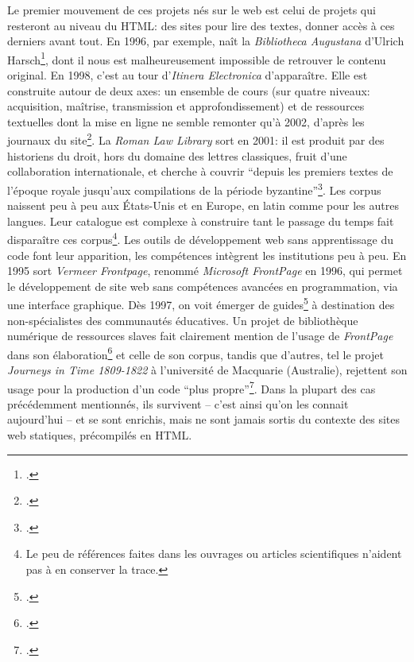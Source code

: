 Le premier mouvement de ces projets nés sur le web est celui de projets qui resteront au niveau du HTML: des sites pour lire des textes, donner accès à ces derniers avant tout. En 1996, par exemple, naît la \textit{Bibliotheca Augustana} d'Ulrich Harsch\footcite{harsch_bibliotheca_nodate}, dont il nous est malheureusement impossible de retrouver le contenu original. En 1998, c'est au tour d'\textit{Itinera Electronica} d'apparaître. Elle est construite autour de deux axes: un ensemble de cours (sur quatre niveaux: acquisition, maîtrise, transmission et approfondissement) et de ressources textuelles dont la mise en ligne ne semble remonter qu'à 2002, d'après les journaux du site\footcite{meurant_itinera_nodate}. La \textit{Roman Law Library} sort en 2001: il est produit par des historiens du droit, hors du domaine des lettres classiques, fruit d'une collaboration internationale, et cherche à couvrir ``depuis les premiers textes de l'époque royale jusqu'aux compilations de la période byzantine''\footcite{lassard_roman_2001}. Les corpus naissent peu à peu aux États-Unis et en Europe, en latin comme pour les autres langues. Leur catalogue est complexe à construire tant le passage du temps fait disparaître ces corpus\footnote{Le peu de références faites dans les ouvrages ou articles scientifiques n'aident pas à en conserver la trace.}. Les outils de développement web sans apprentissage du code font leur apparition, les compétences intègrent les institutions peu à peu. En 1995 sort \textit{Vermeer Frontpage}, renommé \textit{Microsoft FrontPage} en 1996, qui permet le développement de site web sans compétences avancées en programmation, via une interface graphique. Dès 1997, on voit émerger de guides\footcite{la1997guide} à destination des non-spécialistes des communautés éducatives. Un projet de bibliothèque numérique de ressources slaves fait clairement mention de l'usage de \textit{FrontPage} dans son élaboration\footcite{deyrup1998character} et celle de son corpus, tandis que d'autres, tel le projet \textit{Journeys in Time 1809-1822} à l'université de Macquarie (Australie), rejettent son usage pour la production d'un code ``plus propre''\footcite[p.~41]{10.3316/informit.752609435027594}. Dans la plupart des cas précédemment mentionnés, ils survivent -- c'est ainsi qu'on les connait aujourd'hui -- et se sont enrichis, mais ne sont jamais sortis du contexte des sites web statiques, précompilés en HTML.

